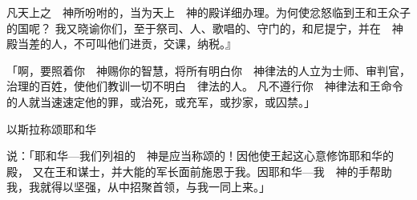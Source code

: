 {凡天上之　神所吩咐的，当为天上　神的殿详细办理。为何使忿怒临到王和王众子的国呢？
我又晓谕你们，至于祭司、{}人、歌唱的、守门的，和尼提宁，并在　神殿当差的人，不可叫他们进贡，交课，纳税。』
\par }{\PP {}「{}啊，要照着你　神赐你的智慧，将所有明白你　神律法的人立为士师、审判官，治理{}的百姓，使他们教训一切不明白　{}律法的人。
凡不遵行你　神律法和王命令的人就当速速定他的罪，或治死，或充军，或抄家，或囚禁。」
\par }{\SH 以斯拉称颂耶和华
\par }{\PP {}说：「耶和华—我们列祖的　神是应当称颂的！因他使王起这心意修饰{}耶和华的殿，
又在王和谋士，并大能的军长面前施恩于我。因耶和华—我　神的手帮助我，我就得以坚强，从{}中招聚首领，与我一同上来。」

}
